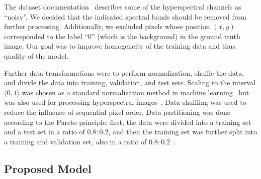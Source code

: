 \documentclass[runningheads]{llncs}
\begin{document}


The dataset documentation~\cite{Romaszewski2021} describes some of the
hyperspectral channels as ``noisy''. We decided that the indicated spectral
bands should be removed from further processing. Additionally, we excluded
pixels whose position $(x,y)$ corresponded to the label ``0'' (which is the
background) in the ground truth image. Our goal was to improve homogeneity of
the training data and thus quality of the model.

Further data transformations were to perform normalization, shuffle the data,
and divide the data into training, validation, and test sets. Scaling to the
interval $\langle 0, 1 \rangle$ was chosen as a standard normalization method in
machine learning~\cite{raschka2019} but was also used for processing
hyperspectral images~\cite{Głomb2023}. Data shuffling was used to reduce the
influence of sequential pixel order. Data partitioning was done according to the
Pareto principle: first, the data were divided into a training set and a test
set in a ratio of $0.8:0.2$, and then the training set was further split into a
training and validation set, also in a ratio of $0.8:0.2$~\cite{Murugan2021}.

\subsection{Proposed Model}\label{proposed_model_section} 
\end{document}
